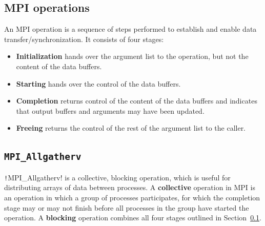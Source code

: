 \documentclass[thesis=M,english]{FITthesis}[2019/12/23]
\newcommand{\csre}[1]{\texttt!#1!}
\begin{document}
\subsection{MPI operations}\label{tech:mpi:op}

An MPI operation is a sequence of steps performed to establish and enable data transfer/synchronization\cite{mpi40}.
It consists of four stages:

\begin{itemize}
    \item \textbf{Initialization} hands over the argument list to the operation, but not the content
          of the data buffers.
    \item \textbf{Starting} hands over the control of the data buffers.
    \item \textbf{Completion} returns control of the content of the data buffers and indicates
          that output buffers and arguments may have been updated.
    \item \textbf{Freeing} returns the control of the rest of the argument list to the caller.

\end{itemize}


\subsection{\texttt{MPI\_Allgatherv}}\label{tech:mpi:gat}

\csre{MPI_Allgatherv} is a collective, blocking operation, which is useful for distributing arrays of
data between processes. A \textbf{collective} operation in MPI is an operation in which a group of
processes participates, for which the completion
stage may or may not finish before all processes in the group have started the operation.
A \textbf{blocking} operation combines all four stages outlined in Section~\ref{tech:mpi:op}.
\end{document}
